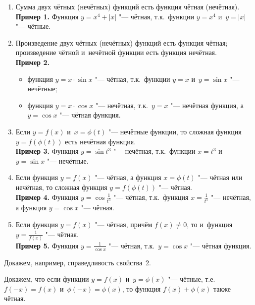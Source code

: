 \begin{enumerate}
\item Сумма двух чётных (нечётных) функций есть функция чётная (нечётная).\\
\textbf{Пример 1.} Функция $y = x^{4} + |x|$ "--- чётная, т.к.\ функции
$y = x^{4}$ и~$y = |x|$ "--- чётные.

\item Произведение двух чётных (нечётных) функций есть функция чётная;
произведение чётной и~нечётной функции есть функция нечётная.\\
\textbf{Пример 2.}
\begin{itemize}
\item функция $y = x \cdot \sin x$ "--- чётная, т.к.\ функции
$y = x$ и~$y = \sin x$ "--- нечётные;
\item функция $y = x \cdot \cos x$ "--- нечётная, т.к.\ $y = x$ "---
нечётная функция, а~$y = \cos x$ "--- чётная функция.
\end{itemize}

\item  Если $y = f(x)$ и~$x = \phi(t)$ "--- нечётные функции, то сложная функция
$y = f(\phi(t))$ есть нечётная функция.\\
\textbf{Пример 3.} Функция $y = \sin t^{3}$ "--- нечётная, т.к.\ функции
$x = t^{3}$ и~$y = \sin x$ "--- нечётные.

\item Если функция $y = f(x)$ "--- чётная, а функция $x = \phi(t)$ "---
чётная или нечётная, то сложная функция $y = f(\phi(t))$ "--- чётная. \\
\textbf{Пример 4.} Функция $\displaystyle y = \cos \frac{1}{t^{5}}$
"--- чётная, т.к.\ функция $\displaystyle x = \frac{1}{t^{5}}$
"--- нечётная, а функция $y = \cos x$ "--- чётная.

\item Если функция $y = f(x)$ "--- чётная, причём $f(x) \ne 0$, то
и~функция $\displaystyle y = \frac{1}{f(x)}$ "--- чётная. \\
\textbf{Пример 5.} Функция $\displaystyle y = \frac{1}{\cos x}$
"--- чётная, т.к.\ $y = \cos x$ "--- чётная функция.

\end{enumerate}

Докажем, например, справедливость свойства~2.

Докажем, что если функции $y = f(x)$ и~$y = \phi(x)$ "--- чётные, т.е.\
$f(-x) = f(x)$ и~$\phi(-x) = \phi(x)$, то функция $f(x) + \phi(x)$
также чётная.

